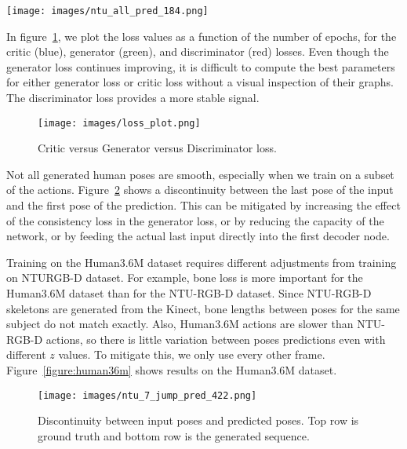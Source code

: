 \documentclass[10pt,twocolumn,letterpaper]{article}
\begin{document}
\begin{figure*}[ht]
\centering
\texttt{[image: images/ntu\_all\_pred\_184.png]}
\caption{Training on all 60 classes from the NTURGB-D dataset, and then predicting 30 poses from 10 input poses. Top row is the ground truth, and each subsequent row corresponds to a random $z$ value drawn from a uniform distribution. Poses to the left of the blue line are the input sequences. Pose to the right of the blue line, starting in the second row, are the predicted future poses for each $z$ value.}
\label{figure:ntu_all_pred_184}
\end{figure*}

In figure~\ref{figure:loss-plot}, we plot the loss values as a function of the number of epochs, for the critic (blue), generator (green), and discriminator (red) losses. Even though the generator loss continues improving, it is difficult to compute the best parameters for either generator loss or critic loss without a visual inspection of their graphs. The discriminator loss provides a more stable signal.

\begin{figure}[H]
\centering
\texttt{[image: images/loss\_plot.png]}
\caption{Critic versus Generator versus Discriminator loss.}
\label{figure:loss-plot}
\end{figure}

Not all generated human poses are smooth, especially when we train on a subset of the actions. Figure~\ref{figure:jumpiness} shows a discontinuity between the last pose of the input and the first pose of the prediction. This can be mitigated by increasing the effect of the consistency loss in the generator loss, or by reducing the capacity of the network, or by feeding the actual last input directly into the first decoder node.

Training on the Human3.6M dataset requires different adjustments from training on NTURGB-D dataset. For example, bone loss is more important for the Human3.6M dataset than for the NTU-RGB-D dataset. Since NTU-RGB-D skeletons are generated from the Kinect, bone lengths between poses for the same subject do not match exactly. Also, Human3.6M actions are slower than NTU-RGB-D actions, so there is little variation between poses predictions even with different $z$ values. To mitigate this, we only use every other frame. Figure~\ref{figure:human36m} shows results on the Human3.6M dataset.

\begin{figure}[ht]
\centering
\texttt{[image: images/ntu\_7\_jump\_pred\_422.png]}
\caption{Discontinuity between input poses and predicted poses. Top row is ground truth and bottom row is the generated sequence.}
\label{figure:jumpiness}
\end{figure}
\end{document}
